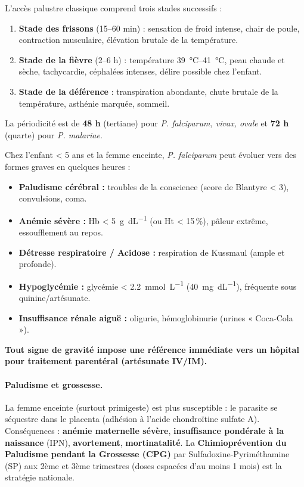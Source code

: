 \documentclass[11pt]{article}
\begin{document}
\begin{definition}
L'accès palustre classique comprend trois stades successifs :
\begin{enumerate}
    \item \textbf{Stade des frissons} (15--60 min) : sensation de froid intense, chair de poule, contraction musculaire, élévation brutale de la température.
    \item \textbf{Stade de la fièvre} (2--6 h) : température \SIrange{39}{41}{\celsius}, peau chaude et sèche, tachycardie, céphalées intenses, délire possible chez l'enfant.
    \item \textbf{Stade de la déférence} : transpiration abondante, chute brutale de la température, asthénie marquée, sommeil.
\end{enumerate}
La périodicité est de \textbf{48 h} (tertiane) pour \emph{P. falciparum, vivax, ovale} et \textbf{72 h} (quarte) pour \emph{P. malariae}.
\end{definition}

\begin{attention}
Chez l'enfant < 5 ans et la femme enceinte, \emph{P. falciparum} peut évoluer vers des formes graves en quelques heures :
\begin{itemize}
    \item \textbf{Paludisme cérébral :} troubles de la conscience (score de Blantyre < 3), convulsions, coma.
    \item \textbf{Anémie sévère :} Hb < \SI{5}{\gram\per\deci\liter} (ou Ht < 15\,\%), pâleur extrême, essoufflement au repos.
    \item \textbf{Détresse respiratoire / Acidose :} respiration de Kussmaul (ample et profonde).
    \item \textbf{Hypoglycémie :} glycémie < \SI{2.2}{\milli\mole\per\liter} (\SI{40}{\milli\gram\per\deci\liter}), fréquente sous quinine/artésunate.
    \item \textbf{Insuffisance rénale aiguë :} oligurie, hémoglobinurie (urines « Coca-Cola »).
\end{itemize}
\textbf{Tout signe de gravité impose une référence immédiate vers un hôpital pour traitement parentéral (artésunate IV/IM).}
\end{attention}

\paragraph{Paludisme et grossesse.}
La femme enceinte (surtout primigeste) est plus susceptible : le parasite se séquestre dans le placenta (adhésion à l'acide chondroïtine sulfate A). Conséquences : \textbf{anémie maternelle sévère}, \textbf{insuffisance pondérale à la naissance} (IPN), \textbf{avortement}, \textbf{mortinatalité}. La \textbf{Chimioprévention du Paludisme pendant la Grossesse (CPG)} par Sulfadoxine-Pyriméthamine (SP) aux 2ème et 3ème trimestres (doses espacées d'au moins 1 mois) est la stratégie nationale.
\end{document}
